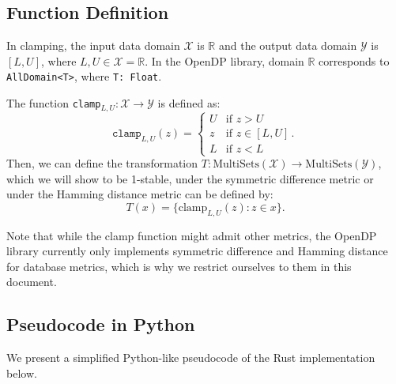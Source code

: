 \documentclass[11pt,a4paper]{article}
\theoremstyle{definition}
\newcommand{\R}{\mathbb{R}}
\newcommand{\X}{\mathcal{X}}
\begin{document}

\subsection{Function Definition}
In clamping, the input data domain $\mathcal{X}$ is $\R$ %
and the output data domain $\mathcal{Y}$ is $[L, U]$, where $L, U \in \X = \R$. In the OpenDP library, domain $\R$ corresponds to \texttt{AllDomain<T>}, where \texttt{T: Float}.

The function \texttt{clamp}$_{L, U}: \mathcal{X} \rightarrow \mathcal{Y}$ is defined as:
\begin{equation}\label{eq:clamp}
\texttt{clamp}_{L, U}(z) = 
\begin{cases} 
      U & \textrm{if } z > U \\
      z & \textrm{if } z \in [L, U] \, . \\
      L & \textrm{if } z < L
\end{cases}
\end{equation}
Then, we can define the transformation $T: \textrm{MultiSets}(\mathcal{X}) \rightarrow \textrm{MultiSets}(\mathcal{Y})$, which we will show to be 1-stable, under the symmetric difference metric or under the Hamming distance metric can be defined by: %
\[
T(x) = \{\textrm{clamp}_{L, U}(z) : z \in x \}.
\]

Note that while the clamp function might admit other metrics, the OpenDP library currently only implements symmetric difference and Hamming distance for database metrics, which is why we restrict ourselves to them in this document.

\subsection{Pseudocode in Python}
We present a simplified Python-like pseudocode of the Rust implementation below.
\end{document}

